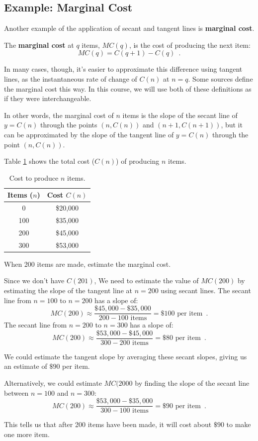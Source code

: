 \subsection*{Example: Marginal Cost} 
\label{ssec:marginalcost}
Another example of the application of secant and tangent lines is {\bf marginal cost}. 
\begin{definition}
    The {\bf marginal cost} at $q$ items, $MC(q)$, is the cost of producing the next item:
$$MC(q)=C(q+1)-C(q) \enspace .$$

In many cases, though, it's easier to approximate this difference using tangent lines, as the instantaneous rate of change of $C(n)$ at $n=q$. Some sources define the marginal cost this way. In this course, we will use both of these definitions as if they were interchangeable.
\end{definition} 
In other words, the marginal cost of $n$ items is the slope of the secant line of $y=C(n)$ through the points $(n, C(n))$ and $(n+1, C(n+1))$, but it can be approximated by the slope of the tangent line of $y=C(n)$ through the point $(n, C(n))$. 
\begin{example}
Table \ref{tab:2-2-cost} shows the total cost ($C(n)$) of producing $n$ items.
\begin{table}[ht!]
\centering
\begin{tabular}{cc}
\toprule
Items ($n$)	& Cost $C(n)$ \\
\midrule
0	& \$20,000\\
100	& \$35,000\\
200	& \$45,000\\	
300	& \$53,000\\
\bottomrule
\end{tabular}
\caption{Cost to produce $n$ items.}
\label{tab:2-2-cost}
\end{table}

When 200 items are made, estimate the marginal cost.

\begin{solution}
Since we don't have $C(201)$, We need to estimate the value of $MC(200)$ by estimating the slope of the tangent line at $n=200$ using secant lines. The secant line from $n=100$ to $n=200$ has a slope of:
$$MC(200) \approx \frac{\$45,000-\$35,000}{200-100 \mbox{ items}} = \$100 \mbox{ per item} \enspace .$$
The secant line from $n=200$ to $n=300$ has a slope of:
$$MC(200) \approx \frac{\$53,000-\$45,000}{300-200 \mbox{ items}} = \$80 \mbox{ per item} \enspace .$$

We could estimate the tangent slope by averaging these secant slopes, giving us an estimate of $\$90$ per item. 

Alternatively, we could estimate $MC(2000$ by finding the slope of the secant line between $n=100$ and $n=300$:
$$MC(200) \approx \frac{\$53,000-\$35,000}{300-100 \mbox{ items}} = \$90 \mbox{ per item} \enspace .$$

This tells us that after 200 items have been made, it will cost about $\$90$ to make one more item.
    \end{solution}
\end{example}


